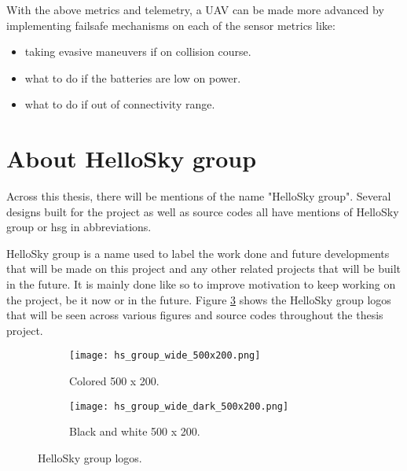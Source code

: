 With the above metrics and telemetry, a UAV can be made more advanced by implementing failsafe mechanisms on each of the sensor metrics like:
\begin{itemize}
    \item taking evasive maneuvers if on collision course.
    \item what to do if the batteries are low on power.
    \item what to do if out of connectivity range.
\end{itemize}




\section{About HelloSky group}
\label{sec:about-hellosky-group}

Across this thesis, there will be mentions of the name "HelloSky group". Several designs built for the project as well as source codes all have mentions of HelloSky group or hsg in abbreviations.

HelloSky group is a name used to label the work done and future developments that will be made on this project and any other related projects that will be built in the future. It is mainly done like so to improve motivation to keep working on the project, be it now or in the future. Figure \ref{fig:hs-group-logos} shows the HelloSky group logos that will be seen across various figures and source codes throughout the thesis project.

\begin{figure}[!htbp]
    \centering
    \begin{subfigure}{0.4\textwidth}
        \texttt{[image: hs\_group\_wide\_500x200.png]}
        \caption{Colored 500 x 200.}
        \label{fig:hs-group-wide-500x200}
    \end{subfigure}
    \hspace*{\fill}
    \begin{subfigure}{0.4\textwidth}
        \texttt{[image: hs\_group\_wide\_dark\_500x200.png]}
        \caption{Black and white 500 x 200.}
        \label{fig:hs-group-wide-dark-500x200}
    \end{subfigure}
    \caption{HelloSky group logos.}
    \label{fig:hs-group-logos}
\end{figure}

